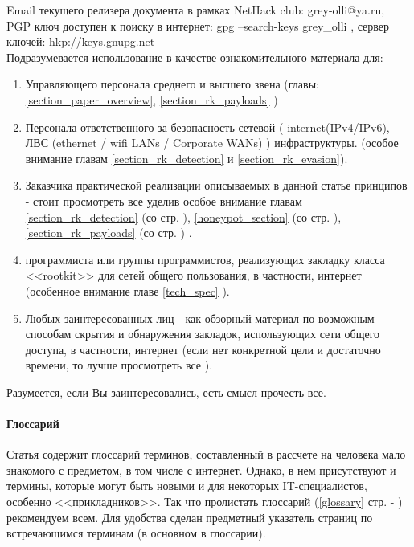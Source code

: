 Email текущего релизера документа в рамках NetHack club: grey-olli@ya.ru,\\ PGP ключ доступен к поиску в интернет: gpg --search-keys grey\_olli , сервер ключей: hkp://keys.gnupg.net \\


Подразумевается использование в качестве ознакомительного материала для:

\begin{enumerate}

\item{Управляющего персонала среднего и высшего звена (главы: \ref{section_paper_overview},
 \ref{section_rk_payloads} ) }

\item{Персонала ответственного за безопасность сетевой
( internet(IPv4/IPv6), ЛВС (ethernet / wifi LANs / Corporate WANs) ) инфраструктуры.
(особое внимание главам \ref{section_rk_detection} и \ref{section_rk_evasion}).
}

\item{Заказчика практической реализации описываемых в данной статье принципов - стоит
 просмотреть все уделив особое внимание главам
\ref{section_rk_detection} (со стр. \pageref{section_rk_detection}),
\ref{honeypot_section} (со стр. \pageref{honeypot_section}),
\ref{section_rk_payloads} (со стр. \pageref{section_rk_payloads}) .}

\item{программиста или группы программистов, реализующих закладку класса <<rootkit>>
для сетей общего пользования, в частности, интернет (особенное внимание главе \ref{tech_spec} ).}

\item{Любых заинтересованных лиц - как
 обзорный материал по возможным способам скрытия и обнаружения закладок,
использующих сети общего доступа, в частности, интернет (если нет
конкретной цели и достаточно времени, то лучше просмотреть все ).}

\end{enumerate}

Разумеется, если Вы заинтересовались, есть смысл прочесть все.

\paragraph{Глоссарий\\}
Статья содержит глоссарий терминов,  составленный в рассчете на человека
мало знакомого с предметом, в том числе с интернет. Однако, в нем
присутствуют и термины, которые могут быть новыми и для некоторых
IT-специалистов, особенно <<прикладников>>. Так что пролистать глоссарий
(\ref{glossary} стр. \pageref{glossary} - \pageref{glossary_end})
рекомендуем всем. Для удобства сделан предметный указатель страниц
по встречающимся терминам (в основном в глоссарии).

